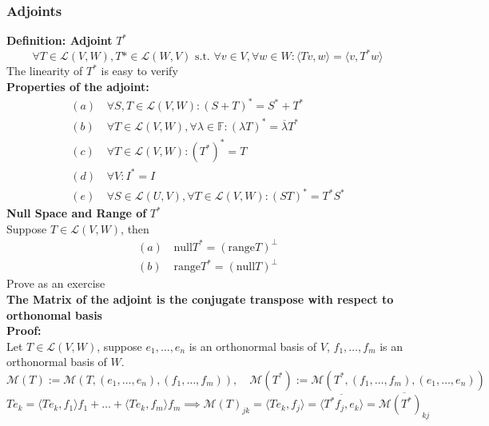 \documentclass{article}
\newcommand{\F}{\mathbb{F}}
\newcommand{\st}{\mbox{ s.t. }}
\newcommand{\0}{{\bf{0}}}
\begin{document}
\subsubsection{Adjoints}
\textbf{Definition: Adjoint} $T^*$
$$\forall T\in\mathcal{L}(V,W),T*\in\mathcal{L}(W,V)\st\forall v\in V,\forall w\in W:\langle Tv,w\rangle=\langle v,T^*w\rangle$$
The linearity of $T^*$ is easy to verify\\
\textbf{Properties of the adjoint:}
\begin{equation}
\begin{split}
    (a)\,&\forall S,T\in\mathcal{L}(V,W):(S+T)^*=S^*+T^*\\
    (b)\,&\forall T\in\mathcal{L}(V,W),\forall\lambda\in\F:(\lambda T)^*=\overline{\lambda}T^*\\
    (c)\,&\forall T\in\mathcal{L}(V,W):(T^*)^*=T\\
    (d)\,&\forall V:I^*=I\\
    (e)\,&\forall S\in\mathcal{L}(U,V),\forall T\in\mathcal{L}(V,W):(ST)^*=T^*S^*
\end{split}
\end{equation}
\textbf{Null Space and Range of }$T^*$\\
Suppose $T\in\mathcal{L}(V,W)$, then
\begin{equation}
\begin{split}
    (a)\,&\mbox{null}T^*=(\mbox{range}T)^\perp\\
    (b)\,&\mbox{range}T^*=(\mbox{null}T)^\perp
\end{split}
\end{equation}
\null\hfill{Prove as an exercise}\\
\textbf{The Matrix of the adjoint is the conjugate transpose with respect to orthonomal basis}\\
\textbf{Proof:}\\
Let $T\in\mathcal{L}(V,W)$, suppose $e_1,\dots,e_n$ is an orthonormal basis of $V$, $f_1,\dots,f_m$ is an orthonormal basis of $W$.
$$\mathcal{M}(T):=\mathcal{M}(T,(e_1,\dots,e_n),(f_1,\dots,f_m)),\quad\mathcal{M}(T^*):=\mathcal{M}(T^*,(f_1,\dots,f_m),(e_1,\dots,e_n))$$
$$Te_k=\langle Te_k,f_1\rangle f_1+\dots+\langle Te_k,f_m\rangle f_m\implies\mathcal{M}(T)_{jk}=\langle Te_k,f_j\rangle=\overline{\langle T^*f_j,e_k\rangle}=\overline{\mathcal{M}(T^*)_{kj}}$$
\end{document}
